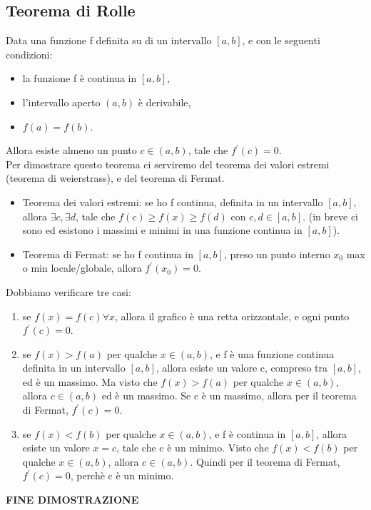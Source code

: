 \documentclass[11pt]{article}
\begin{document}
\subsection{Teorema di Rolle}
Data una funzione f definita su di un intervallo $[a,b]$, e con le seguenti condizioni:\\
\begin{itemize}
    \item la funzione f è continua in $[a,b]$,
    \item l'intervallo aperto $(a,b)$ è derivabile,
    \item $f(a) = f(b)$.
\end{itemize}
Allora esiste almeno un punto $c \in (a,b)$, tale che $f^{'}(c) = 0$.\\
Per dimostrare questo teorema ci serviremo del teorema dei valori estremi (teorema di weierstrass), e del teorema di Fermat.\\
\begin{itemize}
    \item Teorema dei valori estremi: se ho f continua, definita in un intervallo $[a,b]$, allora $\exists c, \exists d$, tale che 
    $f(c) \ge f(x) \ge f(d)$ con $c,d \in [a,b]$. (in breve ci sono ed esistono i massimi e minimi in una funzione continua in $[a,b]$).
    \item Teorema di Fermat: se ho f continua in $[a,b]$, preso un punto interno $x_{0}$ max o min locale/globale, allora $f^{'}(x_{0}) = 0$.
\end{itemize}
Dobbiamo verificare tre casi:\\
\begin{enumerate}
    \item se $f(x) = f(c) \forall x$, allora il grafico è una retta orizzontale, e ogni punto $f^{'}(c) = 0$.
    \item se $f(x) > f(a)$ per qualche $x \in (a,b)$, e f è una funzione continua definita in un intervallo $[a,b]$, allora esiste un valore c, compreso tra $[a,b]$, ed
    è un massimo. Ma visto che $f(x) > f(a)$ per qualche $x \in (a,b)$, allora $c \in (a,b)$ ed è un massimo. Se c è un massimo, allora per il teorema di Fermat, $f^{'}(c) = 0$.
    \item se $f(x) < f(b)$ per qualche $x \in (a,b)$, e f è continua in $[a,b]$, allora esiste un valore $x = c$, tale che c è un minimo. Visto che 
    $f(x) < f(b)$ per qualche $x \in (a,b)$, allora $c \in (a,b)$. Quindi per il teorema di Fermat, $f^{'}(c) = 0$, perchè c è un minimo.
\end{enumerate}
\begin{center}
    \textbf{FINE DIMOSTRAZIONE}
\end{center}
\end{document}
